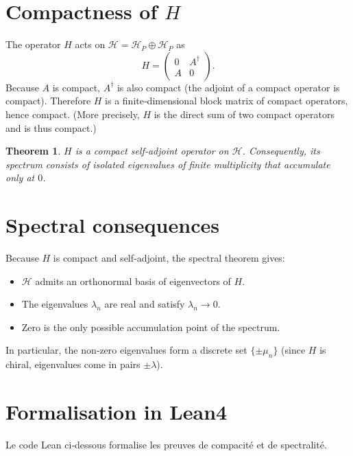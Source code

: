 \documentclass[11pt,a4paper]{article}
\newtheorem{theorem}{Theorem}[section]
\begin{document}
\section{Compactness of $H$}

The operator $H$ acts on $\mathcal{H} = \mathcal{H}_P \oplus \mathcal{H}_P$ as
\[
H = \begin{pmatrix} 0 & A^\dagger \\ A & 0 \end{pmatrix}.
\]
Because $A$ is compact, $A^\dagger$ is also compact (the adjoint of a compact operator is compact). Therefore $H$ is a finite‑dimensional block matrix of compact operators, hence compact. (More precisely, $H$ is the direct sum of two compact operators and is thus compact.)

\begin{theorem}
$H$ is a compact self‑adjoint operator on $\mathcal{H}$. Consequently, its spectrum consists of isolated eigenvalues of finite multiplicity that accumulate only at $0$.
\end{theorem}

\section{Spectral consequences}

Because $H$ is compact and self‑adjoint, the spectral theorem gives:
\begin{itemize}
\item $\mathcal{H}$ admits an orthonormal basis of eigenvectors of $H$.
\item The eigenvalues $\lambda_n$ are real and satisfy $\lambda_n \to 0$.
\item Zero is the only possible accumulation point of the spectrum.
\end{itemize}

In particular, the non‑zero eigenvalues form a discrete set $\{\pm \mu_n\}$ (since $H$ is chiral, eigenvalues come in pairs $\pm \lambda$).

\section{Formalisation in Lean4}

Le code Lean ci‑dessous formalise les preuves de compacité et de spectralité.
\end{document}
